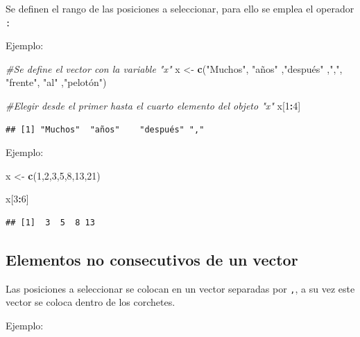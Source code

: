 \documentclass[
]{book}
\newenvironment{Shaded}{\begin{snugshade}}{\end{snugshade}}
\newcommand{\CommentTok}[1]{\textcolor[rgb]{0.56,0.35,0.01}{\textit{#1}}}
\newcommand{\DecValTok}[1]{\textcolor[rgb]{0.00,0.00,0.81}{#1}}
\newcommand{\FunctionTok}[1]{\textcolor[rgb]{0.13,0.29,0.53}{\textbf{#1}}}
\newcommand{\NormalTok}[1]{#1}
\newcommand{\OtherTok}[1]{\textcolor[rgb]{0.56,0.35,0.01}{#1}}
\newcommand{\SpecialCharTok}[1]{\textcolor[rgb]{0.81,0.36,0.00}{\textbf{#1}}}
\newcommand{\StringTok}[1]{\textcolor[rgb]{0.31,0.60,0.02}{#1}}
\begin{document}
Se definen el rango de las posiciones a seleccionar, para ello se emplea el operador \texttt{:}

Ejemplo:

\begin{Shaded}
\begin{Highlighting}[]
\CommentTok{\#Se define el vector con la variable "x"}
\NormalTok{x }\OtherTok{\textless{}{-}} \FunctionTok{c}\NormalTok{(}\StringTok{"Muchos"}\NormalTok{, }\StringTok{"años"}\NormalTok{ ,}\StringTok{"después"}\NormalTok{ ,}\StringTok{","}\NormalTok{, }\StringTok{"frente"}\NormalTok{, }\StringTok{"al"}\NormalTok{ ,}\StringTok{"pelotón"}\NormalTok{)}

\CommentTok{\#Elegir desde el primer hasta el cuarto elemento del objeto "x"}
\NormalTok{x[}\DecValTok{1}\SpecialCharTok{:}\DecValTok{4}\NormalTok{]}
\end{Highlighting}
\end{Shaded}

\begin{verbatim}
## [1] "Muchos"  "años"    "después" ","
\end{verbatim}

Ejemplo:

\begin{Shaded}
\begin{Highlighting}[]
\NormalTok{x }\OtherTok{\textless{}{-}} \FunctionTok{c}\NormalTok{(}\DecValTok{1}\NormalTok{,}\DecValTok{2}\NormalTok{,}\DecValTok{3}\NormalTok{,}\DecValTok{5}\NormalTok{,}\DecValTok{8}\NormalTok{,}\DecValTok{13}\NormalTok{,}\DecValTok{21}\NormalTok{)}

\NormalTok{x[}\DecValTok{3}\SpecialCharTok{:}\DecValTok{6}\NormalTok{]}
\end{Highlighting}
\end{Shaded}

\begin{verbatim}
## [1]  3  5  8 13
\end{verbatim}

\hypertarget{elementos-no-consecutivos-de-un-vector}{%
\subsection{Elementos no consecutivos de un vector}\label{elementos-no-consecutivos-de-un-vector}}

Las posiciones a seleccionar se colocan en un vector separadas por \texttt{,}, a su vez este vector se coloca dentro de los corchetes.

Ejemplo:
\end{document}
